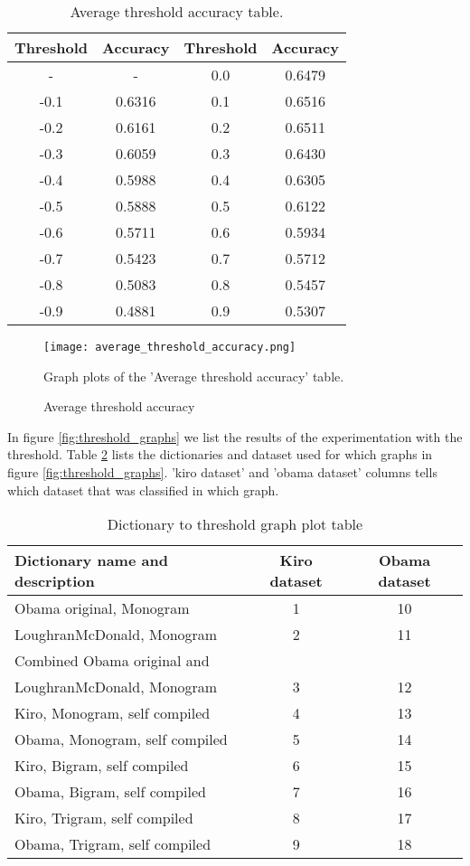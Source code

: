 \begin{table}
\centering
\label{tbl:average_threshold_accuracy}
\caption{Average threshold accuracy table.}
\begin{tabular}{ c c c c }
Threshold & Accuracy & Threshold & Accuracy \\
\hline
- & - & 0.0 & 0.6479 \\
-0.1 & 0.6316 & 0.1 & 0.6516 \\
-0.2 & 0.6161 & 0.2 & 0.6511 \\
-0.3 & 0.6059 & 0.3 & 0.6430 \\
-0.4 & 0.5988 & 0.4 & 0.6305 \\
-0.5 & 0.5888 & 0.5 & 0.6122 \\
-0.6 & 0.5711 & 0.6 & 0.5934 \\
-0.7 & 0.5423 & 0.7 & 0.5712 \\
-0.8 & 0.5083 & 0.8 & 0.5457 \\
-0.9 & 0.4881 & 0.9 & 0.5307 \\
\end{tabular}
\end{table}

\begin{figure}[htb]
    \centering
    \texttt{[image: average\_threshold\_accuracy.png]}
    \label{fig:average_threshold_accuracy}
    \caption{Average threshold accuracy}
Graph plots of the 'Average threshold accuracy' table.
\end{figure}

In figure \ref{fig:threshold_graphs} we list the results of the experimentation
with the threshold. Table \ref{tbl:dictionary_to_threshold} lists the
dictionaries and dataset used for which graphs in figure
\ref{fig:threshold_graphs}.
'kiro dataset' and 'obama dataset' columns tells which dataset that was
classified in which graph.

\begin{table}
\centering
\label{tbl:dictionary_to_threshold}
\caption{Dictionary to threshold graph plot table}
\begin{tabular}{ l c c }
Dictionary name and description & Kiro dataset & Obama dataset \\
\hline
Obama original, Monogram & 1 & 10 \\
LoughranMcDonald, Monogram & 2 & 11 \\
Combined Obama original and \\ LoughranMcDonald, Monogram & 3 & 12 \\
Kiro, Monogram, self compiled & 4 & 13 \\
Obama, Monogram, self compiled & 5 & 14 \\
Kiro, Bigram, self compiled & 6 & 15 \\
Obama, Bigram, self compiled & 7 & 16 \\
Kiro, Trigram, self compiled & 8 & 17 \\
Obama, Trigram, self compiled & 9 & 18 \\
\end{tabular}
\end{table}

